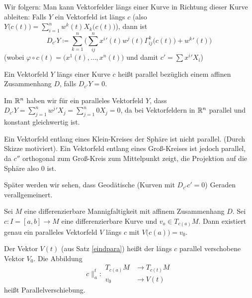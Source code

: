 \documentclass[a4paper,twoside,DIV15,BCOR12mm]{scrbook}
\renewcommand{\da}{\coloneqq}
\begin{document}
Wir folgern: Man kann Vektorfelder längs einer Kurve in Richtung dieser Kurve ableiten: Falls $Y$ ein Vektorfeld ist längs $c$ (also $Y\big(c(t)\big) = \sum_{i=1}^n w^k(t)X_k\big(c(t)\big)$), dann ist
\[
D_{c'}Y \da \sum_{k=1}^n\Big(\sum_{ij}^n {x^i}'(t) w^j(t) \Gamma_{ij}^k\big(c(t)\big) + {w^k}'(t)\Big)
\]
(wobei $\varphi \circ c(t) = \big(x^1(t),\ldots, x^n(t)\big)$ und damit $c' = \sum {x^i}'X_i$)

\begin{definition}
Ein Vektorfeld $Y$ längs einer Kurve $c$ heißt parallel bezüglich einem affinen Zusammenhang $D$, falls $D_{c'}Y = 0$.
\end{definition}

\begin{beispiele}
\item Im $\mathbb{R}^n$ haben wir für ein paralleles Vektorfeld $Y$, dass $D_{c'}Y = \sum_{j=1}^n {w^j}'X_j = \sum_{j=1}^n 0 X_j= 0$, da bei Vektorfeldern in $\mathbb{R}^n$ parallel und konstant gleichwertig ist.
\item Ein Vektorfeld entlang eines Klein-Kreises der Sphäre ist nicht parallel. (Durch Skizze motiviert). Ein Vektorfeld entlang eines Groß-Kreises ist jedoch parallel, da $c''$ orthogonal zum Groß-Kreis zum Mittelpunkt zeigt, die Projektion auf die Sphäre also 0 ist.
\end{beispiele}

Später werden wir sehen, dass Geodätische (Kurven mit $D_{c'}c' = 0$) Geraden verallgemeinert.

\begin{satz}
\label{eindpara}
Sei $M$ eine differenzierbare Mannigfaltigkeit mit affinem Zusammenhang $D$. Sei $c: I=[a,b] \to M$ eine differenzierbare Kurve und $v_o \in T_{c(a)}M$. Dann existiert genau ein paralleles Vektorfeld $V$ längs $c$ mit $V\big(c(a)\big)= v_0$.
\end{satz}

\begin{definition}
Der Vektor $V(t)$ (aus Satz \ref{eindpara}) heißt der längs $c$ parallel verschobene Vektor $V_0$. Die Abbildung
\[
c\|_a^t: 
\begin{aligned}
T_{c(a)}M &\to T_{c(t)}M \\
v_0&\to V(t)
\end{aligned}
\]
heißt Parallelverschiebung.
\end{definition}
\end{document}
